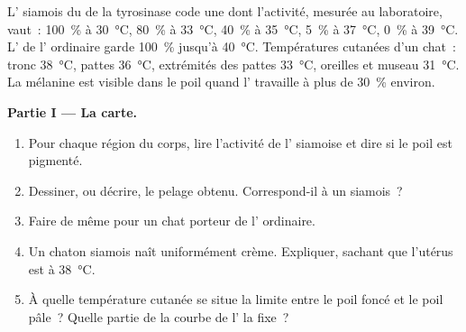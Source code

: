 \begin{problem}
\label{pb:g11:enzymes-and-phenotype:1}
L' siamois du  de la tyrosinase code une  dont
l'activité, mesurée au laboratoire, vaut~: \qty{100}{\percent} à
\qty{30}{\celsius}, \qty{80}{\percent} à \qty{33}{\celsius},
\qty{40}{\percent} à \qty{35}{\celsius}, \qty{5}{\percent} à
\qty{37}{\celsius}, \qty{0}{\percent} à \qty{39}{\celsius}. L'
de l' ordinaire garde \qty{100}{\percent} jusqu'à
\qty{40}{\celsius}. Températures cutanées d'un chat~: tronc
\qty{38}{\celsius}, pattes \qty{36}{\celsius}, extrémités des pattes
\qty{33}{\celsius}, oreilles et museau \qty{31}{\celsius}. La mélanine
est visible dans le poil quand l' travaille à plus de
\qty{30}{\percent} environ.

\medskip
\noindent\textbf{Partie I --- La carte.}
\begin{enumerate}
  \item Pour chaque région du corps, lire l'activité de l'
        siamoise et dire si le poil est pigmenté.
  \item Dessiner, ou décrire, le pelage obtenu. Correspond-il à un
        siamois~?
  \item Faire de même pour un chat porteur de l' ordinaire.
  \item Un chaton siamois naît uniformément crème. Expliquer, sachant
        que l'utérus est à \qty{38}{\celsius}.
  \item À quelle température cutanée se situe la limite entre le poil
        foncé et le poil pâle~? Quelle partie de la courbe de l'
        la fixe~?
\end{enumerate}


\end{problem}
